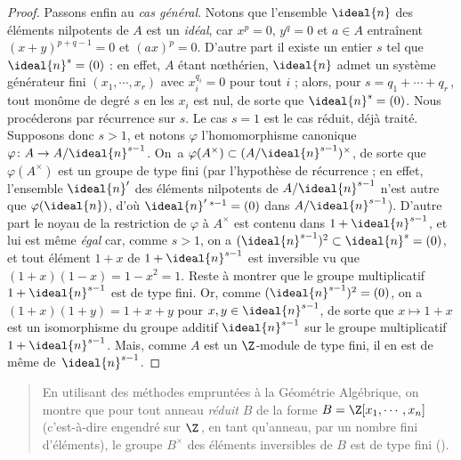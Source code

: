 \documentclass[11pt, %
  title in boldface,
  theorem in new line,
  theorem numbering = section,
  number theorems separately,
  simple name,
]{beaulivre}
\begin{document}
\begin{proof}
        Passons enfin au \emph{cas général}. Notons que l'ensemble \( \ideal{n} \) des éléments nilpotents de \( A \) est un \emph{idéal}, car \( x^p = 0 \), \( y^q = 0 \) et \( a \in A \) entraînent \( (x+y)^{p+q-1} = 0 \) et \( (ax)^p = 0 \). D'autre part il existe un entier \( s \) tel que \( \ideal{n}^s = (0) \) : en effet, \( A \) étant nœthérien, \( \ideal{n} \) admet un système générateur fini \( (x_1, \cdots, x_r) \) avec \( x_i^{q_i} = 0 \) pour tout \( i \) ; alors, pour \( s = q_1 + \cdots + q_r \)\,, tout monôme de degré \( s \) en les \( x_i \) est nul, de sorte que \( \ideal{n}^s = (0) \). Nous procéderons par récurrence sur \( s \). Le cas \( s = 1 \) est le cas réduit, déjà traité. Supposons donc \( s > 1 \), et notons \( \varphi \) l'homomorphisme canonique \( \varphi \colon A \to A/\ideal{n}^{s-1} \). On~a \( \varphi(A^\times) \subset (A/\ideal{n}^{s-1})^\times \), de sorte que \( \varphi(A^\times) \) est un groupe de type fini (par l'hypothèse de récurrence ; en effet, l'ensemble \( \ideal{n}' \) des éléments nilpotents de \( A/\ideal{n}^{s-1} \) n'est autre que \( \varphi(\ideal{n}) \), d'où \( \ideal{n}'\,{}^{s-1} = (0) \) dans \( A/\ideal{n}^{s-1} \)). D'autre part le noyau de la restriction de \( \varphi \) à \( A^\times \) est contenu dans \( 1+\ideal{n}^{s-1} \), et lui est même \emph{égal} car, comme \( s > 1 \), on a \( (\ideal{n}^{s-1})^2 \subset \ideal{n}^s = (0) \), et tout élément \( 1+x \) de \( 1+\ideal{n}^{s-1} \) est inversible vu que \( (1+x)(1-x) = 1-x^2 = 1 \). Reste à montrer que le groupe multiplicatif \( 1+\ideal{n}^{s-1} \) est de type fini. Or, comme \( (\ideal{n}^{s-1})^2 = (0) \), on a \( (1+x)(1+y) = 1+x+y \) pour \( x,y \in \ideal{n}^{s-1} \), de sorte que \( x \mapsto 1+x \) est un isomorphisme du groupe additif \( \ideal{n}^{s-1} \) sur le groupe multiplicatif \( 1+\ideal{n}^{s-1} \). Mais, comme \( A \) est un \( \Z \)‑module de type fini, il en est de même de~\( \ideal{n}^{s-1} \).
    \end{proof}

    \begin{quote}
        En utilisant des méthodes empruntées à la Géométrie Algébrique, on montre que pour tout anneau \emph{réduit} \( B \) de la forme \( B = \Z[x_1, \cdots, x_n] \) (c'est-à-dire engendré sur \( \Z \)\,, en tant qu'anneau, par un nombre fini d'éléments), le groupe \( B^\times \) des éléments inversibles de \( B \) est de type fini (\cite{samuel1966}).
    \end{quote}

\cleardoublepage
{}
{}
\end{document}
